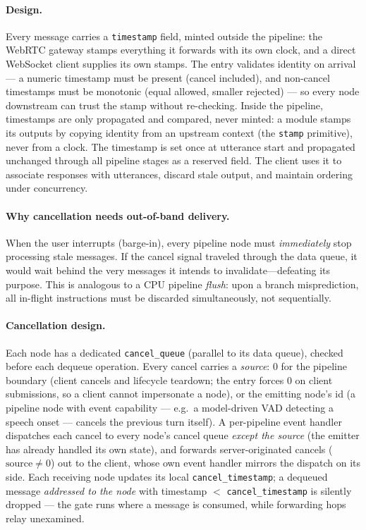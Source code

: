 \documentclass[11pt,a4paper]{article}
\begin{document}
\paragraph{Design.}
Every message carries a \texttt{timestamp} field, minted outside the pipeline: the WebRTC gateway stamps everything it forwards with its own clock, and a direct WebSocket client supplies its own stamps. The entry validates identity on arrival --- a numeric timestamp must be present (cancel included), and non-cancel timestamps must be monotonic (equal allowed, smaller rejected) --- so every node downstream can trust the stamp without re-checking. Inside the pipeline, timestamps are only propagated and compared, never minted: a module stamps its outputs by copying identity from an upstream context (the \texttt{stamp} primitive), never from a clock. The timestamp is set once at utterance start and propagated unchanged through all pipeline stages as a reserved field. The client uses it to associate responses with utterances, discard stale output, and maintain ordering under concurrency.

\paragraph{Why cancellation needs out-of-band delivery.}
When the user interrupts (barge-in), every pipeline node must \emph{immediately} stop processing stale messages. If the cancel signal traveled through the data queue, it would wait behind the very messages it intends to invalidate---defeating its purpose. This is analogous to a CPU pipeline \emph{flush}: upon a branch misprediction, all in-flight instructions must be discarded simultaneously, not sequentially.

\paragraph{Cancellation design.}
Each node has a dedicated \texttt{cancel\_queue} (parallel to its data queue), checked before each dequeue operation. Every cancel carries a \emph{source}: 0 for the pipeline boundary (client cancels and lifecycle teardown; the entry forces 0 on client submissions, so a client cannot impersonate a node), or the emitting node's id (a pipeline node with event capability --- e.g.\ a model-driven VAD detecting a speech onset --- cancels the previous turn itself). A per-pipeline event handler dispatches each cancel to every node's cancel queue \emph{except the source} (the emitter has already handled its own state), and forwards server-originated cancels ($\text{source} \neq 0$) out to the client, whose own event handler mirrors the dispatch on its side. Each receiving node updates its local \texttt{cancel\_timestamp}; a dequeued message \emph{addressed to the node} with timestamp $<$ \texttt{cancel\_timestamp} is silently dropped --- the gate runs where a message is consumed, while forwarding hops relay unexamined.
\end{document}
